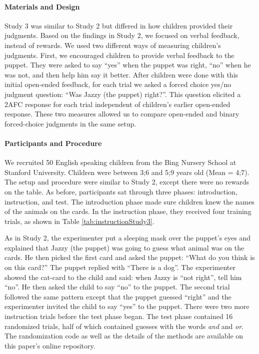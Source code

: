 \documentclass[floatsintext,man]{apa6}
\theoremstyle{definition}
\theoremstyle{definition}
\theoremstyle{definition}
\theoremstyle{remark}
\begin{document}
\paragraph{Materials and Design}\label{materials-and-design-2}

Study 3 was similar to Study 2 but differed in how children provided
their judgments. Based on the findings in Study 2, we focused on verbal
feedback, instead of rewards. We used two different ways of measuring
children's judgments. First, we encouraged children to provide verbal
feedback to the puppet. They were asked to say \enquote{yes} when the
puppet was right, \enquote{no} when he was not, and then help him say it
better. After children were done with this initial open-ended feedback,
for each trial we asked a forced choice yes/no judgment question:
\enquote{Was Jazzy (the puppet) right?}. This question elicited a 2AFC
response for each trial independent of children's earlier open-ended
response. These two measures allowed us to compare open-ended and binary
forced-choice judgments in the same setup.

\paragraph{Participants and
Procedure}\label{participants-and-procedure-2}

We recruited 50 English speaking children from the Bing Nursery School
at Stanford University. Children were between 3;6 and 5;9 years old
(Mean = 4;7). The setup and procedure were similar to Study 2, except
there were no rewards on the table. As before, participants sat through
three phases: introduction, instruction, and test. The introduction
phase made sure children knew the names of the animals on the cards. In
the instruction phase, they received four training trials, as shown in
Table \ref{tab:instructionStudy3}.

As in Study 2, the experimenter put a sleeping mask over the puppet's
eyes and explained that Jazzy (the puppet) was going to guess what
animal was on the cards. He then picked the first card and asked the
puppet: \enquote{What do you think is on this card?} The puppet replied
with \enquote{There is a dog}. The experimenter showed the cat-card to
the child and said: when Jazzy is \enquote{not right}, tell him
\enquote{no}. He then asked the child to say \enquote{no} to the puppet.
The second trial followed the same pattern except that the puppet
guessed \enquote{right} and the experimenter invited the child to say
\enquote{yes} to the puppet. There were two more instruction trials
before the test phase began. The test phase contained 16 randomized
trials, half of which contained guesses with the words \emph{and} and
\emph{or}. The randomization code as well as the details of the methods
are available on this paper's online repository.
\end{document}
